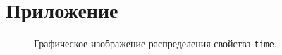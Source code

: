 \section*{Приложение}
%

\begin{figure}[H]
    \caption{Графическое изображение распределения свойства \texttt{time}.}
    \label{img:2-Attribute-Statistics-time}
\end{figure}